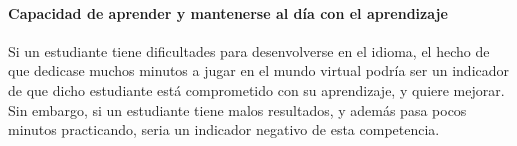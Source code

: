 \paragraph*{Capacidad de aprender y mantenerse al día con el aprendizaje}
Si un estudiante tiene dificultades para desenvolverse en el idioma, el hecho de que dedicase muchos minutos a jugar en el mundo virtual podría ser un indicador de que dicho estudiante está comprometido con su aprendizaje, y quiere mejorar. Sin embargo, si un estudiante tiene malos resultados, y además pasa pocos minutos practicando, seria un indicador negativo de esta competencia.





 











